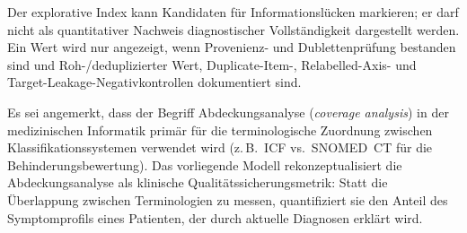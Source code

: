 \documentclass[11pt,a4paper]{article}
\begin{document}
Der explorative Index kann Kandidaten f\"ur Informationsl\"ucken markieren; er darf nicht als quantitativer Nachweis diagnostischer Vollst\"andigkeit dargestellt werden. Ein Wert wird nur angezeigt, wenn Provenienz- und Dublettenpr\"ufung bestanden sind und Roh-/deduplizierter Wert, Duplicate-Item-, Relabelled-Axis- und Target-Leakage-Negativkontrollen dokumentiert sind.

Es sei angemerkt, dass der Begriff \glqq Abdeckungsanalyse\grqq{} (\textit{coverage analysis}) in der medizinischen Informatik prim\"ar f\"ur die terminologische Zuordnung zwischen Klassifikationssystemen verwendet wird (z.\,B.\ ICF vs.\ SNOMED~CT f\"ur die Behinderungsbewertung). Das vorliegende Modell rekonzeptualisiert die Abdeckungsanalyse als klinische Qualit\"atssicherungsmetrik: Statt die \"Uberlappung zwischen Terminologien zu messen, quantifiziert sie den Anteil des Symptomprofils eines Patienten, der durch aktuelle Diagnosen erkl\"art wird.
\end{document}
